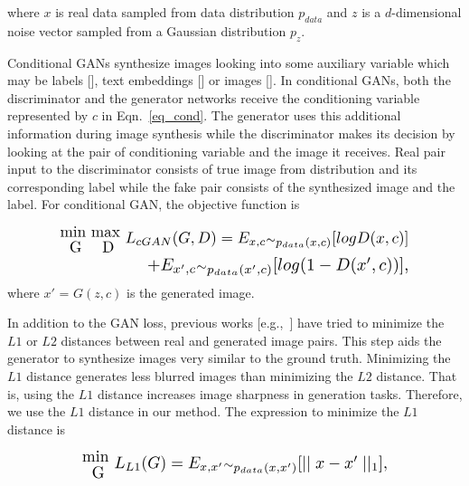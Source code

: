 \documentclass[times,twocolumn,final,authoryear]{elsarticle_modified}
\begin{document}
\noindent where $x$ is real data sampled from data distribution ${p_{data}}$ and $z$ is a $d$-dimensional noise vector sampled from a Gaussian distribution ${p_{z}}$. 

Conditional GANs synthesize images looking into some auxiliary variable which may be labels [\cite{DBLP:journals/corr/MirzaO14}], text embeddings [\cite{han2017stackgan,pmlr-v48-reed16}] or images [\cite{pix2pix2017,CycleGAN2017, pmlr-v70-kim17a}]. In conditional GANs, both the discriminator and the generator networks receive the conditioning variable represented by $c$ in Eqn.~\eqref{eq_cond}. The generator uses this additional information during image synthesis while the discriminator makes its decision by looking at the pair of conditioning variable and the image it receives. Real pair input to the discriminator consists of true image from distribution and its corresponding label while the fake pair consists of the synthesized image and the label. For conditional GAN, the objective function is 

\vspace{-15pt}

\begin{equation}\label{eq_cond}
\begin{split}
\resizebox{0.8\hsize}{!}{$\stackanchor{min }{G} \stackanchor{max  }{D} L_{cGAN}(G,D) = E_{x,c} {\raise.01ex\hbox{$\scriptstyle\sim$}}_{p_{data}(x, c)} [log D(x,c)] 
$}\\ \hspace*{0.5in}
\resizebox{0.6\hsize}{!}{$+ E_{x', c} {\raise.01ex\hbox{$\scriptstyle\sim$}}_{p_{data}(x',c)}[ log(1 - D(x',c))],
$}\end{split}
\end{equation}
where $x'$ = $G(z,c)$ is the generated image.

In addition to the GAN loss, previous works [e.g.,~\cite{pix2pix2017,CycleGAN2017,pathak2016context}] have tried to minimize the $L1$ or $L2$ distances between real and generated image pairs. This step aids the generator to synthesize images very similar to the ground truth. Minimizing the $L1$ distance generates less blurred images than minimizing the $L2$ distance. That is, using the $L1$ distance increases image sharpness in generation tasks. Therefore, we use the $L1$ distance in our method. The expression to minimize the $L1$ distance is
\vspace{-15pt}

\begin{equation}\label{eq_cond_l1}
\begin{split}
\resizebox{0.7\hsize}{!}{$\stackanchor{min  }{G} L_{L1}(G)=E_{x,x'} {\raise.01ex\hbox{$\scriptstyle\sim$}}_{p_{data}(x,x')}[\mid \mid x - x' \mid \mid _1],
$}\end{split}
\end{equation}
\end{document}
